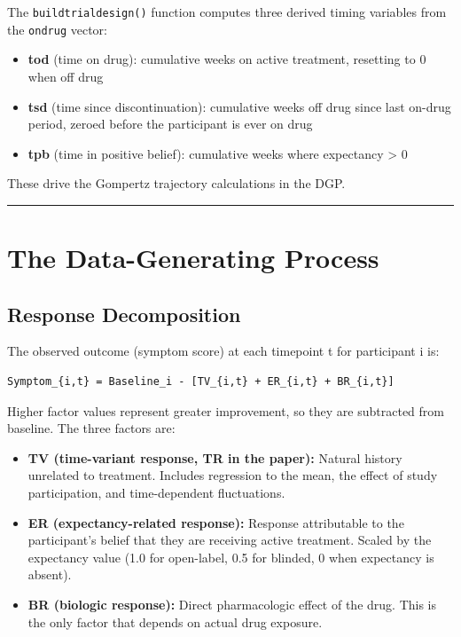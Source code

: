 \documentclass[11pt]{article}
\begin{document}
The \texttt{buildtrialdesign()} function computes three derived timing
variables from the \texttt{ondrug} vector:

\begin{itemize}
  \item \textbf{tod} (time on drug): cumulative weeks on active treatment,
    resetting to 0 when off drug
  \item \textbf{tsd} (time since discontinuation): cumulative weeks off drug
    since last on-drug period, zeroed before the participant is
    ever on drug
  \item \textbf{tpb} (time in positive belief): cumulative weeks where
    expectancy > 0
\end{itemize}

These drive the Gompertz trajectory calculations in the DGP.

\bigskip\noindent\rule{\textwidth}{0.4pt}\bigskip

\section{The Data-Generating Process}

\subsection{Response Decomposition}

The observed outcome (symptom score) at each timepoint t for
participant i is:

\begin{verbatim}
Symptom_{i,t} = Baseline_i - [TV_{i,t} + ER_{i,t} + BR_{i,t}]
\end{verbatim}

Higher factor values represent greater improvement, so they are
subtracted from baseline. The three factors are:

\begin{itemize}
  \item \textbf{TV (time-variant response, TR in the paper):} Natural history
    unrelated to treatment. Includes regression to the mean, the
    effect of study participation, and time-dependent fluctuations.
  \item \textbf{ER (expectancy-related response):} Response attributable to
    the participant's belief that they are receiving active
    treatment. Scaled by the expectancy value (1.0 for open-label,
    0.5 for blinded, 0 when expectancy is absent).
  \item \textbf{BR (biologic response):} Direct pharmacologic effect of the
    drug. This is the only factor that depends on actual drug
    exposure.
\end{itemize}
\end{document}
